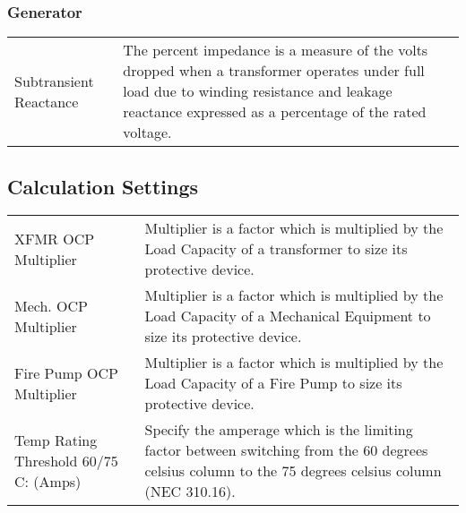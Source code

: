 \documentclass[letterpaper,10pt,english]{sphinxmanual}
\begin{document}
\subsubsection{Generator}
\label{\detokenize{docs/definitions/index-definitions:generator}}

\begin{savenotes}\sphinxattablestart
\centering
\begin{tabulary}{\linewidth}[t]{|T|T|}
\hline
\sphinxstyletheadfamily 
{}
&\sphinxstyletheadfamily 
{}
\\
\hline
Subtransient Reactance
&
The percent impedance is a measure of the volts dropped when a transformer operates under full load due to winding resistance and leakage reactance expressed as a percentage of the rated voltage.
\\
\hline
\end{tabulary}
\par
\sphinxattableend\end{savenotes}


\subsection{Calculation Settings}
\label{\detokenize{docs/definitions/index-definitions:calculation-settings}}\label{\detokenize{docs/definitions/index-definitions:calculation-settings-definitions}}

\begin{savenotes}\sphinxattablestart
\centering
\begin{tabulary}{\linewidth}[t]{|T|T|}
\hline
\sphinxstyletheadfamily 
{}
&\sphinxstyletheadfamily 
{}
\\
\hline
XFMR OCP Multiplier
&
Multiplier is a factor which is multiplied by the Load Capacity of a transformer to size its protective device.
\\
\hline
Mech. OCP Multiplier
&
Multiplier is a factor which is multiplied by the Load Capacity of a Mechanical Equipment to size its protective device.
\\
\hline
Fire Pump OCP Multiplier
&
Multiplier is a factor which is multiplied by the Load Capacity of a Fire Pump to size its protective device.
\\
\hline
Temp Rating Threshold 60/75 C: (Amps)
&
Specify the amperage which is the limiting factor between switching from the 60 degrees celsius column to the 75 degrees celsius column (NEC 310.16).
\\
\hline
\end{tabulary}
\par
\sphinxattableend\end{savenotes}
\end{document}
